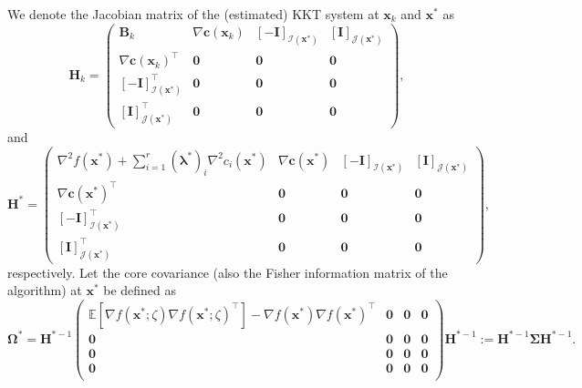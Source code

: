 \documentclass[aos]{imsart}
\numberwithin{equation}{section}
\theoremstyle{plain}
\begin{document}
 We denote the Jacobian matrix of the (estimated) KKT system at $\bm{x}_k$ and $\bm{x}^{*}$ as
\begin{equation*}
    \bm{H}_k = \left(\begin{array}{cccc}
           \bm{B}_k & \nabla \bm{c}(\bm{x}_k) & \left[-\bm{I}\right]_{\mathcal{I}(\bm{x}^{*})} & \left[\bm{I}\right]_{\mathcal{J}(\bm{x}^{*})}\\
           \nabla \bm{c}(\bm{x}_k)^{\top} & \bm{0} & \bm{0} & \bm{0}\\
           \left[-\bm{I}\right]_{\mathcal{I}(\bm{x}^{*})}^{\top} & \bm{0} & \bm{0} & \bm{0} \\
           \left[\bm{I}\right]_{\mathcal{J}(\bm{x}^{*})}^{\top} & \bm{0} & \bm{0} & \bm{0}
       \end{array} \right),
\end{equation*}
and 
\begin{equation*}
    \bm{H}^{*} = \left(\begin{array}{cccc}
           \nabla^2 f(\bm{x}^{*}) + \sum_{i=1}^{r} (\bm{\lambda}^{*})_{i} \nabla^2 c_i(\bm{x}^{*}) & \nabla \bm{c}(\bm{x}^{*}) & \left[-\bm{I}\right]_{\mathcal{I}(\bm{x}^{*})} & \left[\bm{I}\right]_{\mathcal{J}(\bm{x}^{*})}\\
           \nabla \bm{c}(\bm{x}^{*})^{\top} & \bm{0} & \bm{0} & \bm{0}\\
           \left[-\bm{I}\right]_{\mathcal{I}(\bm{x}^{*})}^{\top} & \bm{0} & \bm{0} & \bm{0} \\
           \left[\bm{I}\right]_{\mathcal{J}(\bm{x}^{*})}^{\top} & \bm{0} & \bm{0} & \bm{0}
       \end{array} \right),
\end{equation*}
respectively. Let the core covariance (also the Fisher information matrix of the algorithm) at $\bm{x}^{*}$ be defined as
\begin{equation}
\label{def_covariance_matrix}
    \bm{\Omega}^{*} = \bm{H}^{* -1} \left( \begin{array}{cccc}
        \mathbb{E}\left[ \nabla f(\bm{x}^{*};\zeta) \nabla f(\bm{x}^{*};\zeta)^{\top}  \right] - \nabla f(\bm{x}^{*}) \nabla f(\bm{x}^{*})^{\top} & \bm{0} & \bm{0}  & \bm{0}   \\
        \bm{0} & \bm{0} & \bm{0}  & \bm{0}\\
        \bm{0} & \bm{0} & \bm{0}  & \bm{0}\\
        \bm{0} & \bm{0} & \bm{0}  & \bm{0}\\
    \end{array}  \right) \bm{H}^{* -1} := \bm{H}^{* -1} \bm{\Sigma} \bm{H}^{* -1}.
\end{equation}
\end{document}
